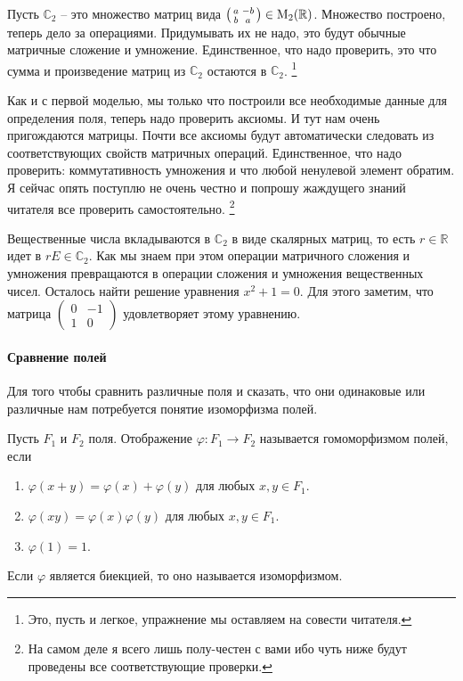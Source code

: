 Пусть $\mathbb C_2$ -- это множество матриц вида $\left(\begin{smallmatrix}{a}&{-b}\\{b}&{a}\end{smallmatrix}\right)\in\operatorname{M}_{2}(\mathbb R)$.
Множество построено, теперь дело за операциями.
Придумывать их не надо, это будут обычные матричные сложение и умножение.
Единственное, что надо проверить, это что сумма и произведение матриц из $\mathbb C_2$ остаются в $\mathbb C_2$.%
\footnote{Это, пусть и легкое, упражнение мы оставляем на совести читателя.} 

Как и с первой моделью, мы только что построили все необходимые данные для определения поля, теперь надо проверить аксиомы.
И тут нам очень пригождаются матрицы.
Почти все аксиомы будут автоматически следовать из соответствующих свойств матричных операций.
Единственное, что надо проверить: коммутативность умножения и что любой ненулевой элемент обратим.
Я сейчас опять поступлю не очень честно и попрошу жаждущего знаний читателя все проверить самостоятельно.%
\footnote{На самом деле я всего лишь полу-честен с вами ибо чуть ниже будут проведены все соответствующие проверки.}

Вещественные числа вкладываются в $\mathbb C_2$ в виде скалярных матриц, то есть $r\in\mathbb R$ идет в $rE\in\mathbb C_2$.
Как мы знаем при этом операции матричного сложения и умножения превращаются в операции сложения и умножения вещественных чисел.
Осталось найти решение уравнения $x^2+1 = 0$.
Для этого заметим, что матрица $\left(\begin{smallmatrix}{0}&{-1}\\{1}&{0}\end{smallmatrix}\right)$ удовлетворяет этому уравнению.

\paragraph{Сравнение полей}

Для того чтобы сравнить различные поля и сказать, что они одинаковые или различные нам потребуется понятие изоморфизма полей.

\begin{definition}
Пусть $F_1$ и $F_2$ поля.
Отображение $\varphi\colon F_1\to F_2$ называется гомоморфизмом полей, если 
\begin{enumerate}
\item $\varphi(x+y) = \varphi(x) + \varphi(y)$ для любых $x,y\in F_1$.

\item $\varphi(xy) = \varphi(x)\varphi(y)$ для любых $x,y\in F_1$.

\item $\varphi(1) = 1$.
\end{enumerate}
Если $\varphi$ является биекцией, то оно называется изоморфизмом.
\end{definition}

